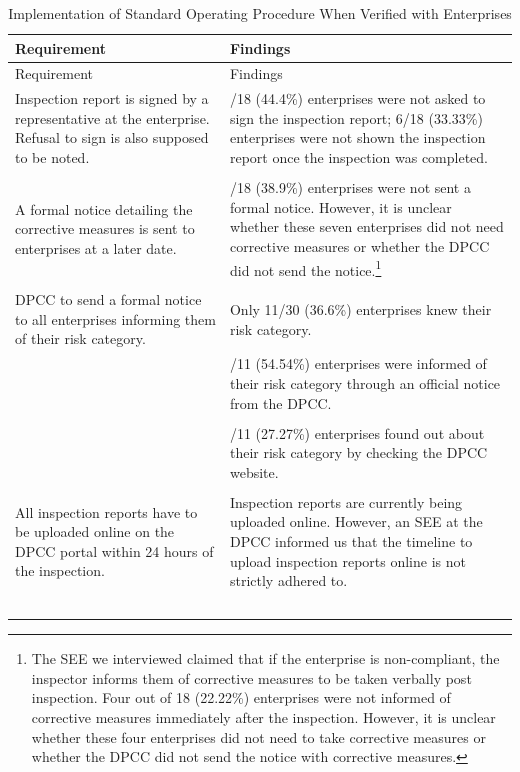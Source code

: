 \documentclass[a4paper, 12pt]{article}
\begin{document}
\begin{longtable}{>{\raggedright}p{7.5cm}>{\raggedright\arraybackslash}p{7.5cm}}
\caption{Implementation of Standard Operating Procedure When Verified with Enterprises}\\
\toprule
Requirement & Findings \\
\midrule
\endfirsthead
Requirement & Findings \\
\midrule
\endhead
\endfoot
\endlastfoot
Inspection report is signed by a representative at the enterprise. Refusal to sign is also supposed to be noted. & 8/18 (44.4\%) enterprises were not asked to sign the inspection report; 6/18 (33.33\%) enterprises were not shown the inspection report once the inspection was completed. \\
 & \\
A formal notice detailing the corrective measures is sent to enterprises at a later date. & 7/18 (38.9\%) enterprises were not sent a formal notice. However, it is unclear whether these seven enterprises did not need corrective measures or whether the DPCC did not send the notice.\footnote{The SEE we interviewed claimed that if the enterprise is non-compliant, the inspector informs them of corrective measures to be taken verbally post inspection. Four out of 18 (22.22\%) enterprises were not informed of corrective measures immediately after the inspection. However, it is unclear whether these four enterprises did not need to take corrective measures or whether the DPCC did not send the notice with corrective measures.} \\
 & \\
DPCC to send a formal notice to all enterprises informing them of their risk category. & Only 11/30 (36.6\%) enterprises knew their risk category. \\
 & 6/11 (54.54\%) enterprises were informed of their risk category through an official notice from the DPCC. \\
 & \\
& 3/11 (27.27\%) enterprises found out about their risk category by checking the DPCC website. \\
 & \\
All inspection reports have to be uploaded online on the DPCC portal within 24 hours of the inspection. & Inspection reports are currently being uploaded online. However, an SEE at the DPCC informed us that the timeline to upload inspection reports online is not strictly adhered to. \\
\bottomrule\
\end{longtable}
	
\end{document}
